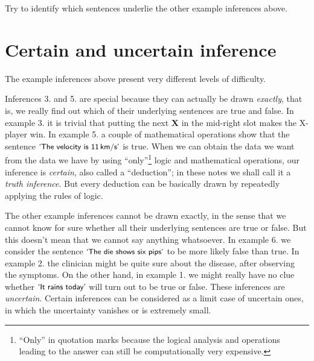 \documentclass[
  a4paper,
  DIV=11,
  numbers=noendperiod,
  oneside]{scrreprt}
\begin{document}
\begin{tcolorbox}[enhanced jigsaw, rightrule=.15mm, colbacktitle=quarto-callout-caution-color!10!white, coltitle=black, titlerule=0mm, title={Exercise}, colback=white, bottomrule=.15mm, toptitle=1mm, opacitybacktitle=0.6, toprule=.15mm, arc=.35mm, bottomtitle=1mm, colframe=quarto-callout-caution-color-frame, breakable, left=2mm, opacityback=0, leftrule=.75mm]

Try to identify which sentences underlie the other example inferences
above.

\end{tcolorbox}

\hypertarget{certain-and-uncertain-inference}{%
\section{Certain and uncertain
inference}\label{certain-and-uncertain-inference}}

The example inferences above present very different levels of
difficulty.

Inferences 3. and 5. are special because they can actually be drawn
\emph{exactly}, that is, we really find out which of their underlying
sentences are true and false. In example 3. it is trivial that putting
the next {\textbf{X}} in the mid-right slot makes the X-player win. In
example 5. a couple of mathematical operations show that the sentence
\(\textsf{\small`The velocity is 11\,km/s'}\) is true. When we can
obtain the data we want from the data we have by using
``only''\footnote{``Only'' in quotation marks because the logical
  analysis and operations leading to the answer can still be
  computationally very expensive.} logic and mathematical operations,
our inference is \emph{certain}, also called a ``deduction''; in these
notes we shall call it a \emph{truth inference}. But every deduction can
be basically drawn by repeatedly applying the rules of logic.

The other example inferences cannot be drawn exactly, in the sense that
we cannot know for sure whether all their underlying sentences are true
or false. But this doesn't mean that we cannot say anything whatsoever.
In example 6. we consider the sentence
\(\textsf{\small`The die shows six pips'}\) to be more likely false than
true. In example 2. the clinician might be quite sure about the disease,
after observing the symptoms. On the other hand, in example 1. we might
really have no clue whether \(\textsf{\small`It rains today'}\) will
turn out to be true or false. These inferences are \emph{uncertain}.
Certain inferences can be considered as a limit case of uncertain ones,
in which the uncertainty vanishes or is extremely small.
\end{document}
